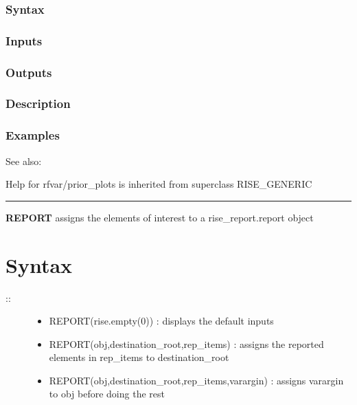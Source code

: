 \documentclass[letterpaper,10pt,english]{sphinxmanual}
\begin{document}
\subsubsection{Syntax}
\label{classes/models/@rfvar/rfvar:id97}

\subsubsection{Inputs}
\label{classes/models/@rfvar/rfvar:id98}

\subsubsection{Outputs}
\label{classes/models/@rfvar/rfvar:id99}

\subsubsection{Description}
\label{classes/models/@rfvar/rfvar:id100}

\subsubsection{Examples}
\label{classes/models/@rfvar/rfvar:id101}
See also:

Help for rfvar/prior\_plots is inherited from superclass RISE\_GENERIC


\bigskip\hrule{}\bigskip

\label{classes/models/@rfvar/rfvar:report}
\textbf{REPORT} assigns the elements of interest to a rise\_report.report object


\section{Syntax}
\label{classes/models/@rfvar/rfvar:id102}\begin{description}
\item[{::}] \leavevmode\begin{itemize}
\item {} 
REPORT(rise.empty(0)) : displays the default inputs

\item {} 
REPORT(obj,destination\_root,rep\_items) : assigns the reported
elements in rep\_items to destination\_root

\item {} 
REPORT(obj,destination\_root,rep\_items,varargin) : assigns varargin to
obj before doing the rest

\end{itemize}

\end{description}
\end{document}
